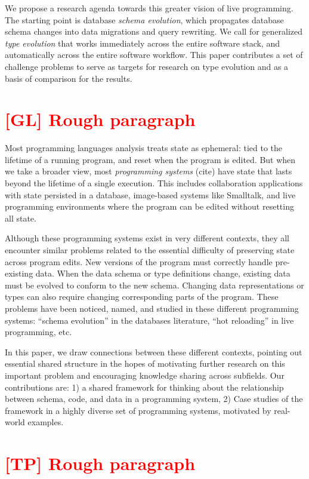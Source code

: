 \documentclass[english,submission]{programming}
\begin{document}
We propose a research agenda towards this greater vision of live programming. The starting point is database \textit{schema evolution}, which propagates database schema changes into data migrations and query rewriting. We call for generalized \textit{type evolution} that works immediately across the entire software stack, and automatically across the entire software workflow. This paper contributes a set of challenge problems to serve as targets for research on type evolution and as a basis of comparison for the results.

\section{\textcolor{red}{[GL] Rough paragraph}}

Most programming languages analysis treats state as ephemeral: tied to the lifetime of a running program, and reset when the program is edited. But when we take a broader view, most \textit{programming systems} (cite) have state that lasts beyond the lifetime of a single execution. This includes collaboration applications with state persisted in a database, image-based systems like Smalltalk, and live programming environments where the program can be edited without resetting all state.

Although these programming systems exist in very different contexts, they all encounter similar problems related to the essential difficulty of preserving state across program edits. New versions of the program must correctly handle pre-existing data. When the data schema or type definitions change, existing data must be evolved to conform to the new schema. Changing data representations or types can also require changing corresponding parts of the program. These problems have been noticed, named, and studied in these different programming systems: ``schema evolution'' in the databases literature, ``hot reloading'' in live programming, etc.

In this paper, we draw connections between these different contexts, pointing out essential shared structure in the hopes of motivating further research on this important problem and encouraging knowledge sharing across subfields. Our contributions are: 1) a shared framework for thinking about the relationship between schema, code, and data in a programming system, 2) Case studies of the framework in a highly diverse set of programming systems, motivated by real-world examples.


\section{\textcolor{red}{[TP] Rough paragraph}}
\end{document}
